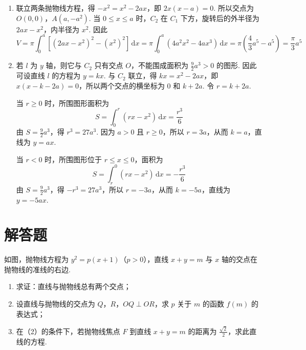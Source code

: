 \documentclass[UTF8,a4paper,oneside,11pt]{ctexbook}
\begin{document}
\begin{solution}
\begin{enumerate}
\item 联立两条抛物线方程，得 \(-x^2=x^2-2ax\)，即 \(2x(x-a)=0\). 所以交点为 \(O(0,0)\)，\(A(a,-a^2)\). 当 \(0\leqslant x\leqslant a\) 时，\(C_2\) 在 \(C_1\) 下方，旋转后的外半径为 \(2ax-x^2\)，内半径为 \(x^2\). 因此
\[
V=\pi\int_0^a\left[(2ax-x^2)^2-(x^2)^2\right]\,\mathrm{d}x
=\pi\int_0^a(4a^2x^2-4ax^3)\,\mathrm{d}x
=\pi\left(\frac43a^5-a^5\right)=\frac\pi3a^5
\]
\item 若 \(l\) 为 \(y\) 轴，则它与 \(C_2\) 只有交点 \(O\)，不能围成面积为 \(\frac92a^3>0\) 的图形. 因此可设直线 \(l\) 的方程为 \(y=kx\). 与 \(C_2\) 联立，得 \(kx=x^2-2ax\)，即 \(x(x-k-2a)=0\)，所以两个交点的横坐标为 \(0\) 和 \(k+2a\). 令 \(r=k+2a\).

当 \(r\geqslant0\) 时，所围图形面积为
\[
S=\int_0^r\left(rx-x^2\right)\,\mathrm{d}x=\frac{r^3}{6}
\]
由 \(S=\frac92a^3\)，得 \(r^3=27a^3\). 因为 \(a>0\) 且 \(r\geqslant0\)，所以 \(r=3a\)，从而 \(k=a\)，直线为 \(y=ax\).

当 \(r<0\) 时，所围图形位于 \(r\leqslant x\leqslant0\)，面积为
\[
S=\int_r^0\left(rx-x^2\right)\,\mathrm{d}x=-\frac{r^3}{6}
\]
由 \(S=\frac92a^3\)，得 \(-r^3=27a^3\)，所以 \(r=-3a\)，从而 \(k=-5a\)，直线为 \(y=-5ax\).
\end{enumerate}
\end{solution}

\section{解答题}

\begin{problem}
如图，抛物线方程为 \(y^{2}=p(x+1)\)（\(p>0\)），直线 \(x+y=m\) 与 \(x\) 轴的交点在抛物线的准线的右边.

\begin{enumerate}
\item 求证：直线与抛物线总有两个交点；
\item 设直线与抛物线的交点为 \(Q\)，\(R\)，\(OQ \perp OR\)，求 \(p\) 关于 \(m\) 的函数 \(f(m)\) 的表达式；
\item 在（2）的条件下，若抛物线焦点 \(F\) 到直线 \(x + y = m\) 的距离为 \(\frac{\sqrt{2}}{2}\)，求此直线的方程.
\end{enumerate}

\end{problem}
\end{document}
